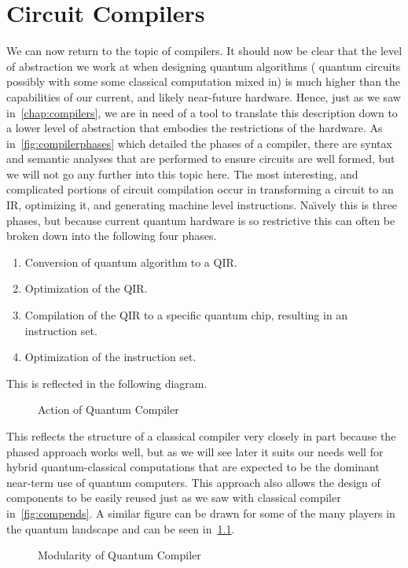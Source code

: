 \chapter{Circuit Compilers}\label{chap:circuit-compilers}

We can now return to the topic of compilers.
It should now be clear that the level of abstraction we work at when designing quantum algorithms (\ie{} quantum circuits possibly with some some classical computation mixed in) is much higher than the capabilities of our current, and likely near-future hardware.
Hence, just as we saw in~\cref{chap:compilers}, we are in need of a tool to translate this description down to a lower level of abstraction that embodies the restrictions of the hardware.
As in~\cref{fig:compilerphases} which detailed the phases of a compiler, there are syntax and semantic analyses that are performed to ensure circuits are well formed, but we will not go any further into this topic here.
The most interesting, and complicated portions of circuit compilation occur in transforming a circuit to an \ac{IR}, optimizing it, and generating machine level instructions.
Na\"{\i}vely this is three phases, but because current quantum hardware is so restrictive this can often be broken down into the following four phases.

\begin{enumerate}
    \item Conversion of quantum algorithm to a \ac{QIR}.
    \item Optimization of the \ac{QIR}.
    \item Compilation of the \ac{QIR} to a specific quantum chip, resulting in an instruction set.
    \item Optimization of the instruction set.
\end{enumerate}
This is reflected in the following diagram.
\begin{figure}[h] %
    \centering
    
    \caption{Action of Quantum Compiler}
\end{figure}

This reflects the structure of a classical compiler very closely in part because the phased approach works well, but as we will see later it suits our needs well for hybrid quantum-classical computations that are expected to be the dominant near-term use of quantum computers.
This approach also allows the design of components to be easily reused just as we saw with classical compiler in~\cref{fig:compends}.
A similar figure can be drawn for some of the many players in the quantum landscape and can be seen in~\cref{fig:optionsq}.
\begin{figure}[ht]
    \centering
    
    \caption{Modularity of Quantum Compiler}\label{fig:optionsq}
\end{figure}

